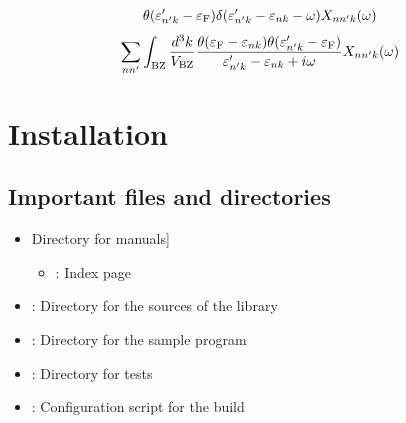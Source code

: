 \documentclass[letterpaper,10pt,pdftex,openany,english]{sphinxmanual}
\begin{document}
\begin{equation*}
\begin{split}
\begin{align}
\theta(\varepsilon'_{n' k} - \varepsilon_{\rm F})
\delta(\varepsilon'_{n' k} - \varepsilon_{n k} - \omega)
X_{n n' k}(\omega)
\end{align}\end{split}
\end{equation*}\begin{equation*}
\begin{split}\begin{align}
\sum_{n n'}
\int_{\rm BZ} \frac{d^3 k}{V_{\rm BZ}}
\frac{
\theta(\varepsilon_{\rm F} - \varepsilon_{n k})
\theta(\varepsilon'_{n' k} - \varepsilon_{\rm F})}
{\varepsilon'_{n' k} - \varepsilon_{n k} + i \omega}
X_{n n' k}(\omega)
\end{align}\end{split}
\end{equation*}
\sphinxstepscope


\chapter{Installation}
\label{\detokenize{install:installation}}\label{\detokenize{install::doc}}

\section{Important files and directories}
\label{\detokenize{install:important-files-and-directories}}\begin{itemize}
\item {} \begin{description}
\sphinxlineitem{\sphinxcode{\sphinxupquote{doc/}}}{[}Directory for manuals{]}\begin{itemize}
\item {} 
\sphinxAtStartPar
{} : Index page

\end{itemize}

\end{description}

\item {} 
\sphinxAtStartPar
{} : Directory for the sources of the library

\item {} 
\sphinxAtStartPar
{} : Directory for the sample program

\item {} 
\sphinxAtStartPar
{} : Directory for tests

\item {} 
\sphinxAtStartPar
{} : Configuration script for the build

\end{itemize}
\end{document}
